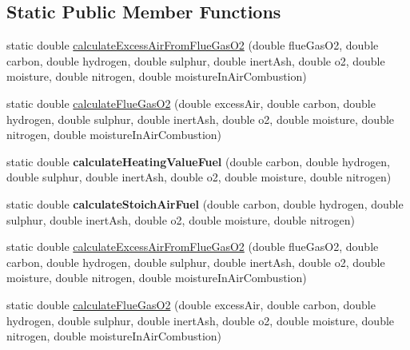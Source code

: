 \subsection*{Static Public Member Functions}
\begin{DoxyCompactItemize}
\item 
static double \hyperlink{class_solid_liquid_flue_gas_material_a57ddf04184687f8efe031986b591ad6b}{calculate\+Excess\+Air\+From\+Flue\+Gas\+O2} (double flue\+Gas\+O2, double carbon, double hydrogen, double sulphur, double inert\+Ash, double o2, double moisture, double nitrogen, double moisture\+In\+Air\+Combustion)
\item 
static double \hyperlink{class_solid_liquid_flue_gas_material_a39dbc6f412ce2ec739ed8107fbdc68a7}{calculate\+Flue\+Gas\+O2} (double excess\+Air, double carbon, double hydrogen, double sulphur, double inert\+Ash, double o2, double moisture, double nitrogen, double moisture\+In\+Air\+Combustion)
\item 
\mbox{\label{class_solid_liquid_flue_gas_material_aa6f11cd466965e30af4f8c30d7a5f402}} 
static double {\bfseries calculate\+Heating\+Value\+Fuel} (double carbon, double hydrogen, double sulphur, double inert\+Ash, double o2, double moisture, double nitrogen)
\item 
\mbox{\label{class_solid_liquid_flue_gas_material_a66b7f3b94b25d1ebf4217e3b099212e8}} 
static double {\bfseries calculate\+Stoich\+Air\+Fuel} (double carbon, double hydrogen, double sulphur, double inert\+Ash, double o2, double moisture, double nitrogen)
\item 
static double \hyperlink{class_solid_liquid_flue_gas_material_abecacec1d6f108a8cdf002a9f67972c7}{calculate\+Excess\+Air\+From\+Flue\+Gas\+O2} (double flue\+Gas\+O2, double carbon, double hydrogen, double sulphur, double inert\+Ash, double o2, double moisture, double nitrogen, double moisture\+In\+Air\+Combustion)
\item 
static double \hyperlink{class_solid_liquid_flue_gas_material_a33152fce2511a4db7240461a7de950a5}{calculate\+Flue\+Gas\+O2} (double excess\+Air, double carbon, double hydrogen, double sulphur, double inert\+Ash, double o2, double moisture, double nitrogen, double moisture\+In\+Air\+Combustion)
\item 
\mbox{\label{class_solid_liquid_flue_gas_material_a301ff1dc16086e191638b881a553539d}} 

\end{DoxyCompactItemize}

